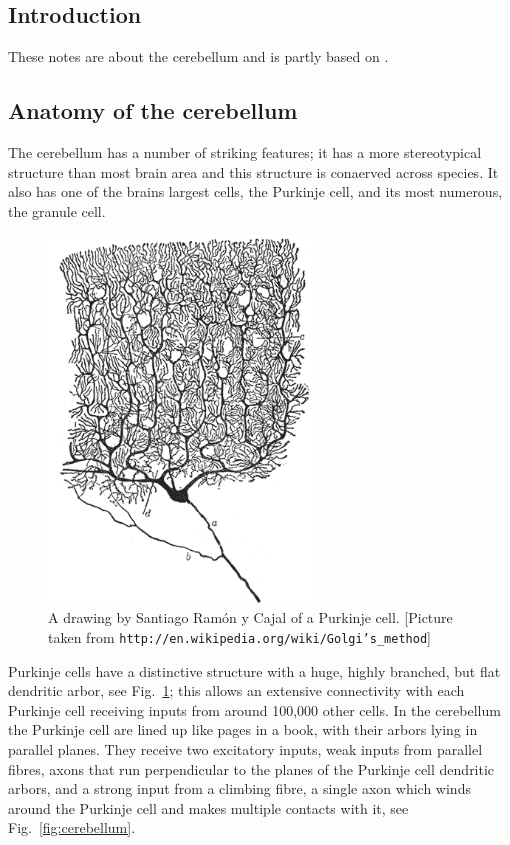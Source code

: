 \documentclass[11pt,a4paper]{scrartcl}
\begin{document}
\subsection*{Introduction}
These notes are about the cerebellum and is partly based on \cite{Albus1971a}.

\subsection*{Anatomy of the cerebellum}
The cerebellum has a number of striking features; it has a more
stereotypical structure than most brain area and this structure is
conaerved across species. It also has one of the brains largest cells,
the Purkinje cell, and its most numerous, the granule cell.

\begin{figure}
\begin{center}
\includegraphics[width=7cm]{Purkinje_cell_by_Cajal.png}
\end{center}
\caption{A drawing by Santiago Ram\'{o}n y Cajal of a Purkinje cell. [Picture taken from \texttt{http://en.wikipedia.org/wiki/Golgi's\_method}]\label{fig:PC}}
\end{figure}

Purkinje cells have a distinctive structure with a huge, highly
branched, but flat dendritic arbor, see Fig.~\ref{fig:PC}; this allows
an extensive connectivity with each Purkinje cell receiving inputs
from around 100,000 other cells. In the cerebellum the Purkinje cell
are lined up like pages in a book, with their arbors lying in parallel
planes. They receive two excitatory inputs, weak inputs from parallel
fibres, axons that run perpendicular to the planes of the Purkinje
cell dendritic arbors, and a strong input from a climbing fibre, a
single axon which winds around the Purkinje cell and makes multiple
contacts with it, see Fig.~\ref{fig:cerebellum}.
\end{document}
